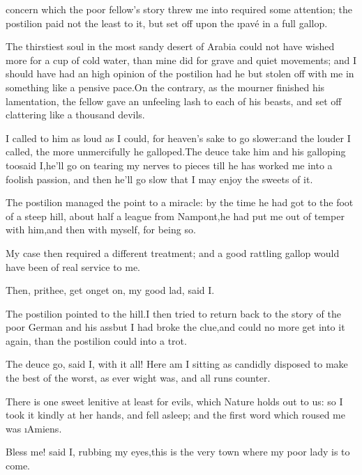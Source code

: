 \documentclass[twoside]{article}
\begin{document}


 concern which the poor fellow’s story threw me into required some
attention; the postilion paid not the least to it, but set off upon the
\i{pavé} in a full gallop.

The thirstiest soul in the most sandy desert of Arabia could not have
wished more for a cup of cold water, than mine did for grave and quiet
movements; and I should have had an high opinion of the postilion had he
but stolen off with me in something like a pensive pace.\tsk On the contrary,
as the mourner finished his lamentation, the fellow gave an unfeeling
lash to each of his beasts, and set off clattering like a thousand
devils.

I called to him as loud as I could, for heaven’s sake to go slower:\tsk and
the louder I called, the more unmercifully he galloped.\tsk The deuce take
him and his galloping too\tsk said I,\tsk he’ll go on tearing my nerves to pieces
till he has worked me into a foolish passion, and then he’ll go slow that
I may enjoy the sweets of it.

The postilion managed the point to a miracle: by the time he had got to
the foot of a steep hill, about half a league from Nampont,\tsk he had put me
out of temper with him,\tsk and then with myself, for being so.

My case then required a different treatment; and a good rattling gallop
would have been of real service to me.\tsk 

\tsk Then, prithee, get on\tsk get on, my good lad, said I.

The postilion pointed to the hill.\tsk I then tried to return back to the
story of the poor German and his ass\tsk but I had broke the clue,\tsk and could
no more get into it again, than the postilion could into a trot.

\tsk The deuce go, said I, with it all!  Here am I sitting as candidly
disposed to make the best of the worst, as ever wight was, and all runs
counter.

There is one sweet lenitive at least for evils, which Nature holds out to
us: so I took it kindly at her hands, and fell asleep; and the first word
which roused me was \i{Amiens}.

\tsk Bless me! said I, rubbing my eyes,\tsk this is the very town where my poor
lady is to come.




\end{document}
